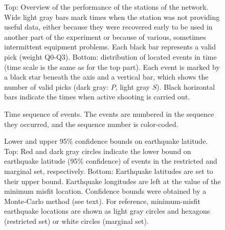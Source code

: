 \documentclass[jgrga]{agu2001} %
\renewcommand{\includefig}[2]{}
\newlength{\tw}
\providecommand{\DIFaddbegin}{} %
\providecommand{\DIFaddend}{} %
\providecommand{\DIFdelbegin}{} %
\providecommand{\DIFdelend}{} %
\begin{document}
\setcounter{table}{0}
\renewcommand{\thetable}{A\arabic{table}}


\DIFdelbegin %

\DIFdelend %
\DIFaddbegin 

\clearpage
\DIFaddend 

\begin{table}
\label{tbl:stations}
\end{table}


\clearpage


\begin{figure}

\includefig{timeline/timeline}{0.8\tw} %

\caption{Top: Overview of the performance of the stations of the network.
Wide light gray bars mark times when the station was not providing
useful data, either because they were recovered early to be used in
another part of the experiment or because of various, sometimes
intermittent equipment problems.  Each black bar represents a valid
pick (weight Q0-Q3).  Bottom: distribution of located events in time
(time scale is the same as for the top part).  Each event is marked by
a black star beneath the axis and a
vertical bar, which shows the number of valid picks (dark gray: $P$, light
gray $S$).  Black horizontal bars indicate the times when active
shooting is carried out.}
\label{fig:timeline}
\end{figure}

\begin{figure}

\includefig{time-map/time-map}{0.8\tw} %

\caption{Time sequence of events.  The events are numbered in the
sequence they occurred, and the sequence number is color-coded.}
\label{fig:time-map}
\end{figure}


\begin{figure}

\includefig{seismag-map-95/seismag-map-95-0}{0.65\tw} %

\includefig{seismag-map-95/seismag-map-95-1}{0.65\tw} %

\caption{Lower and upper 95\% confidence bounds on earthquake
latitude.   Top: Red and dark gray circles
indicate the lower bound on earthquake latitude (95\% confidence) of
events in the restricted and marginal set, respectively.
Bottom: Earthquake latitudes are set to their upper bound.
Earthquake longitudes are left at the value of the minimum misfit
location.  Confidence bounds were obtained by a Monte-Carlo method
(see text). For reference, minimum-misfit earthquake locations are shown as 
 light gray circles and hexagons  (restricted set) or white circles
(marginal set). }
\label{fig:map95lat}
\end{figure}
\end{document}
